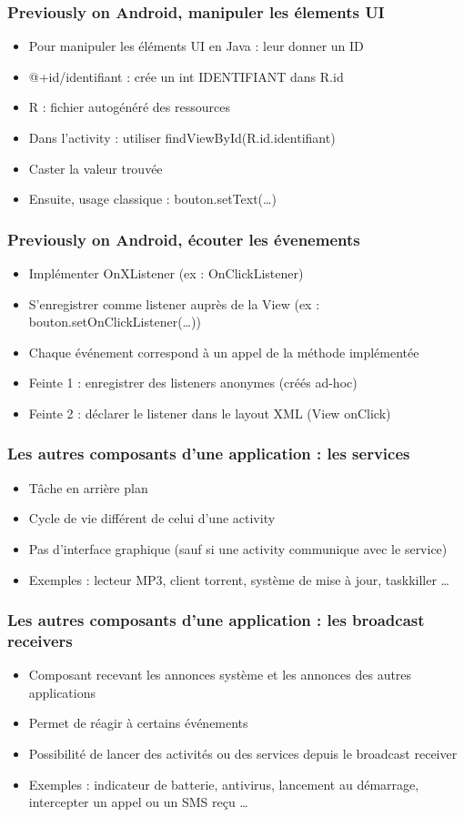 \documentclass{beamer}
\begin{document}
\begin{frame}[fragile] 
\frametitle{Previously on Android, manipuler les élements UI}
\begin{itemize}
  \item Pour manipuler les éléments UI en Java : leur donner un ID
  \item @+id/identifiant : crée un int IDENTIFIANT dans R.id
  \item R : fichier autogénéré des ressources
  \item Dans l'activity : utiliser findViewById(R.id.identifiant)
  \item Caster la valeur trouvée
  \item Ensuite, usage classique : bouton.setText(\ldots)
\end{itemize}
\end{frame}
\begin{frame}[fragile] 
\frametitle{Previously on Android, écouter les évenements}
\begin{itemize}
  \item Implémenter OnXListener (ex : OnClickListener)
  \item S'enregistrer comme listener auprès de la View
  (ex : bouton.setOnClickListener(\ldots))
  \item Chaque événement correspond à un appel de la méthode implémentée
  \item Feinte 1 : enregistrer des listeners anonymes (créés ad-hoc)
  \item Feinte 2 : déclarer le listener dans le layout XML (View onClick)
  
\end{itemize}
\end{frame}
\begin{frame}[fragile]
\frametitle{Les autres composants d'une application : les services}
\begin{itemize}
 \item Tâche en arrière plan
 \item Cycle de vie différent de celui d'une activity
 \item Pas d'interface graphique (sauf si une activity communique avec le
 service)
 \item Exemples : lecteur MP3, client torrent, système de mise à jour, taskkiller \ldots
 \end{itemize}
\end{frame}
\begin{frame}[fragile]
\frametitle{Les autres composants d'une application : les broadcast receivers}
\begin{itemize}
 \item Composant recevant les annonces système et les annonces des autres applications
 \item Permet de réagir à certains événements
 \item Possibilité de lancer des activités ou des services depuis le broadcast receiver
 \item Exemples : indicateur de batterie, antivirus, lancement au démarrage,
 intercepter un appel ou un SMS reçu \ldots
 \end{itemize}
\end{frame}
\end{document}

